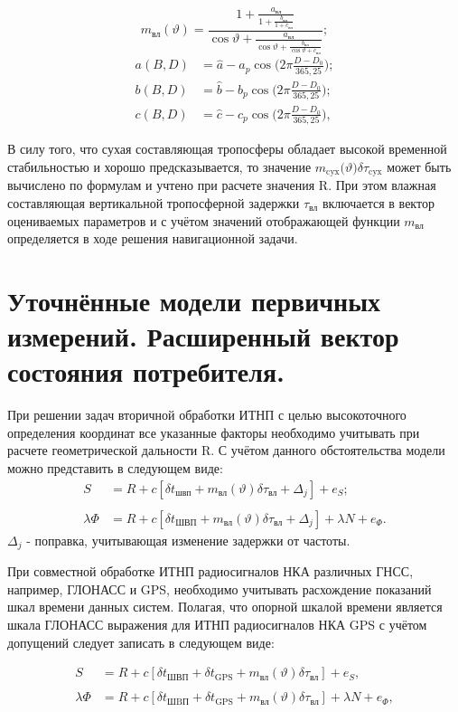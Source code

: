 \documentclass[14pt,a4paper,oneside]{extarticle}
\begin{document}
\[m_\text{вл}\left(\vartheta\right)=\frac{1+\frac{a_\text{вл}}{1+\frac{b_\text{вл}}{1+c_\text{вл}}}}{\cos\vartheta+\frac{a_\text{вл}}{\cos\vartheta+\frac{b_\text{вл}}{\cos\vartheta+c_\text{вл}}}};\]
\[\begin{aligned}a(B,D)&=\hat{a}-a_p\cos\biggl(2\pi\frac{D-D_0}{365,25}\biggr);\\b(B,D)&=\hat{b}-b_p\cos\biggl(2\pi\frac{D-D_0}{365,25}\biggr);\\c(B,D)&=\hat{c}-c_p\cos\biggl(2\pi\frac{D-D_0}{365,25}\biggr),\end{aligned}\]

В силу того, что сухая составляющая тропосферы обладает высокой временной стабильностью и хорошо предсказывается, то значение $m_\text{cyx}\text{(}\vartheta)\delta\tau_\text{cyx}$ может быть вычислено по формулам и учтено при расчете значения R. При этом влажная составляющая вертикальной тропосферной задержки $\tau_\text{вл}$ включается в вектор оцениваемых параметров и с учётом значений отображающей функции $m_\text{вл}$ определяется в ходе решения навигационной задачи.

\section{Уточнённые модели первичных измерений. Расширенный вектор состояния потребителя.}

При решении задач вторичной обработки ИТНП с целью высокоточного определения координат все указанные факторы необходимо учитывать при расчете геометрической дальности R. С учётом данного обстоятельства модели можно представить в следующем виде:
\[\begin{aligned}S&=R+c\left[\delta t_\text{швп}+m_\text{вл}(\vartheta)\delta\tau_\text{вл}+\Delta_j\right]+e_S;\\\\\lambda\Phi&=R+c\left[\delta t_\text{ШВП}+m_\text{вл}(\vartheta)\delta\tau_\text{вл}+\Delta_j\right]+\lambda N+e_\Phi.\end{aligned}\]
$\Delta_j$ - поправка, учитывающая изменение задержки от частоты.

При совместной обработке ИТНП радиосигналов НКА различных ГНСС, например, ГЛОНАСС и GPS, необходимо учитывать расхождение показаний шкал времени данных систем. Полагая, что опорной шкалой времени является шкала ГЛОНАСС выражения для ИТНП радиосигналов НКА GPS с учётом допущений следует записать в следующем виде:

\[\begin{aligned}S&=R+c\left[\delta t_\text{ШВП}+\delta t_\text{GPS}+m_\text{вл}(\vartheta)\delta\tau_\text{вл}\right]+e_S,\\\\\lambda\Phi&=R+c\left[\delta t_\text{ШBП}+\delta t_\text{GPS}+m_\text{вл}(\vartheta)\delta\tau_\text{вл}\right]+\lambda N+e_\Phi,\end{aligned}\]
\end{document}
